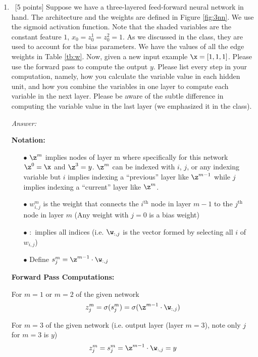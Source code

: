 \documentclass[12pt, fullpage,letterpaper]{article}
\begin{document}
\begin{enumerate}
	\item~[5 points] Suppose we have a three-layered feed-forward neural network in hand. The architecture and the weights are defined in Figure \ref{fig:3nn}. We use the sigmoid activation function. Note that the shaded variables are the constant feature $1$, \ie $x_0 = z_{0}^1 = z_{0}^2 = 1$. As we discussed in the class, they are used to account for the bias parameters. 
	We have the values of all the edge weights in Table \ref{tb:w}. Now, given a new input example $\x=[1, 1, 1]$. Please use the forward pass to compute the output $y$. Please list every step in your computation, namely, how you calculate the variable value in each hidden unit, and how  you combine the variables in one layer to compute each variable in the next layer. Please be aware of the subtle difference in computing the variable value in the last layer (we emphasized it in the class). 
	

	\textit{Answer:}

	\textbf{Notation:}
	\begin{enumerate}
	\item[$\bullet$] $\z^m$ implies nodes of layer m where specifically for this network $\z^0 = \x$ and $\z^3 = y$.  
	$\z^m$ can be indexed with $i$, $j$, or any indexing variable but $i$ implies indexing a ``previous'' layer like $\z^{m-1}$ while $j$ implies indexing a ``current'' layer like $\z^{m}$.

	\item[$\bullet$] $w^{m}_{i,j}$ is the weight that connects the $i^{\text{th}}$ node in layer $m-1$ to the $j^{\text{th}}$ node in layer $m$ (Any weight with $j=0$ is a bias weight)

	\item[$\bullet$] $:$ implies all indices (i.e. $\w_{:,j}$ is the vector formed by selecting all $i$ of $w_{i,j}$)

	\item[$\bullet$] Define $s_j^m = \z^{m-1} \cdot \w_{:,j}$

	\end{enumerate}

	\textbf{Forward Pass Computations:}

	For $m = 1$ or $m = 2$ of the given network
	\[
		z_j^m = \sigma(s_j^m) = \sigma(\z^{m-1} \cdot \w_{:,j}) 
	\]

	For $m = 3$ of the given network (i.e. output layer (layer $m = 3$), note only $j$ for $m = 3$ is $y$)
	\[
		z_j^m = s_j^m = \z^{m-1} \cdot \w_{:,j} = y 
	\]


\end{enumerate}
\end{document}
